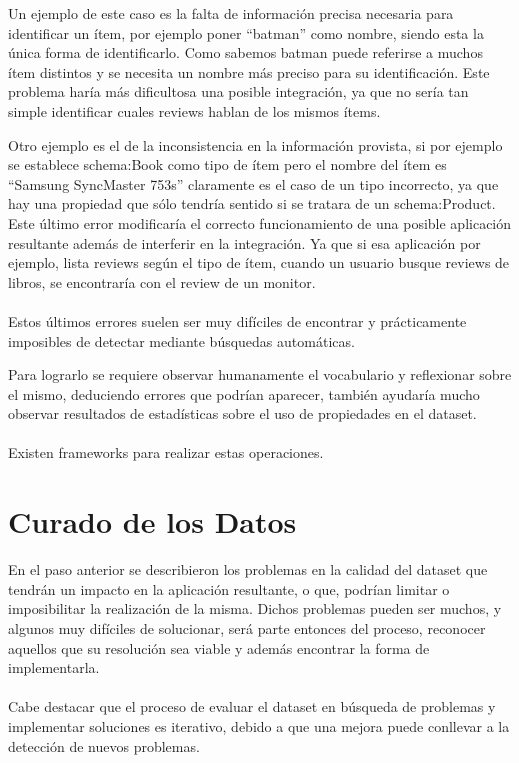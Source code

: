 Un ejemplo de este caso es la falta de información precisa necesaria para identificar un ítem, por ejemplo poner ``batman'' como nombre, siendo esta la única forma de identificarlo. Como sabemos batman puede referirse a muchos ítem distintos y se necesita un nombre más preciso para su identificación.
Este problema haría más dificultosa una posible integración, ya que no sería tan simple identificar cuales reviews hablan de los mismos ítems.

Otro ejemplo es el de la inconsistencia en la información provista, si por ejemplo se establece schema:Book como tipo de ítem pero el nombre del ítem es ``Samsung SyncMaster 753s'' claramente es el caso de un tipo incorrecto, ya que hay una propiedad que sólo tendría sentido si se tratara de un schema:Product.
Este último error modificaría el correcto funcionamiento de una posible aplicación resultante además de interferir en la integración. Ya que si esa aplicación por ejemplo, lista reviews según el tipo de ítem, cuando un usuario busque reviews de libros, se encontraría con el review de un monitor.
\\\\
Estos últimos errores suelen ser muy difíciles de encontrar y prácticamente imposibles de detectar mediante búsquedas automáticas.

Para lograrlo se requiere observar humanamente el vocabulario y reflexionar sobre el mismo, deduciendo errores que podrían aparecer, también ayudaría mucho observar resultados de estadísticas sobre el uso de propiedades en el dataset.
\\\\
Existen frameworks para realizar estas operaciones.

%
\section{Curado de los Datos}

En el paso anterior se describieron los problemas en la calidad del dataset que tendrán un impacto en la aplicación resultante, 
o que, podrían limitar o imposibilitar la realización de la misma. Dichos problemas pueden ser muchos, y algunos muy difíciles
de solucionar, será parte entonces del proceso, reconocer aquellos que su resolución sea viable y además encontrar la forma de 
implementarla.
\\\\
Cabe destacar que el proceso de evaluar el dataset en búsqueda de problemas y implementar soluciones es iterativo, debido a que 
una mejora puede conllevar a la detección de nuevos problemas.

